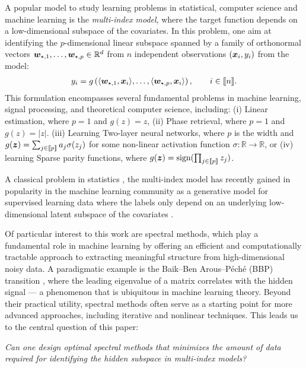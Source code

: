 
A popular model to study learning problems in statistical, computer science and machine learning is the {\emph {multi-index model}}, where the target function depends on a low-dimensional subspace of the covariates.  In this problem, one aim at identifying the $p$-dimensional linear subspace spanned by a family of orthonormal vectors ${\boldsymbol w}_{\star,1},\dots,{\boldsymbol w}_{\star,p}\in\mathbb{R}^{d}$ from $n$ independent observations $({\boldsymbol x}_{i},y_{i})$ from the model:
\begin{align}
    y_{i}=g\left(\langle {\boldsymbol w}_{\star,1},{\boldsymbol x}_{i}\rangle,\dots,\langle {\boldsymbol w}_{\star,p},{\boldsymbol x}_{i}\rangle\right), \qquad i\in \llbracket n \rrbracket .
\end{align}
This formulation encompasses several fundamental problems in machine learning, signal processing, and theoretical computer science, including:
(i) Linear estimation, where $p=1$ and $g(z)=z$, (ii) Phase retrieval, where $p=1$ and $g(z)=|z|$.
(iii) Learning Two-layer neural networks, where $p$ is the width and ${g({\boldsymbol z})=\sum_{j\in  \llbracket p \rrbracket }a_{j}\sigma(z_{j})}$ for some non-linear activation function $\sigma:\mathbb{R}\to\mathbb{R}$, or (iv)  learning Sparse parity functions, where $g({\boldsymbol z})=\text{sign}(\prod_{j\in \llbracket p \rrbracket }z_{j})$.

A classical problem in statistics \cite{friedman1981projection, yuan2011identifiability, Babichev2018}, the multi-index model has recently gained in popularity in the machine learning community as a generative model for supervised learning data where the labels only depend on an underlying low-dimensional latent subspace of the covariates \cite{aubin2018committee, damian2022neural, dandi2024two}.

Of particular interest to this work are spectral methods, which play a fundamental role in machine learning by offering an efficient and computationally tractable approach to extracting meaningful structure from high-dimensional noisy data. A paradigmatic example is the Baik–Ben Arous–Péché (BBP) transition \cite{baik2005phase}, where the leading eigenvalue of a matrix correlates with the hidden signal — a phenomenon that is ubiquitous in machine learning theory. Beyond their practical utility, spectral methods often serve as a starting point for more advanced approaches, including iterative and nonlinear techniques. This leads us to the central question of this paper:

\begin{center} 
\textit{Can one design optimal spectral methods that minimizes the amount of data required for identifying the hidden subspace in multi-index models?} 
\end{center}

